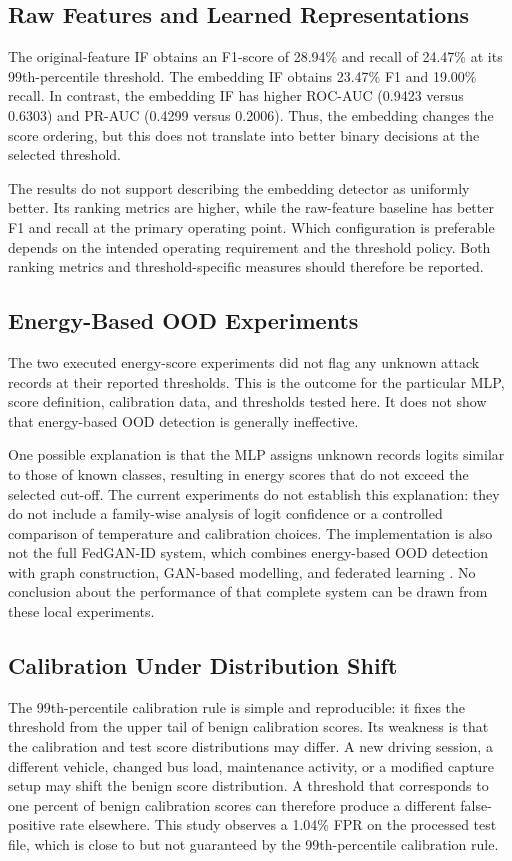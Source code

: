 \documentclass[journal]{IEEEtran}
\begin{document}
\subsection{Raw Features and Learned Representations}
The original-feature IF obtains an F1-score of 28.94\% and recall of 24.47\% at its 99th-percentile threshold. The embedding IF obtains 23.47\% F1 and 19.00\% recall. In contrast, the embedding IF has higher ROC-AUC (0.9423 versus 0.6303) and PR-AUC (0.4299 versus 0.2006). Thus, the embedding changes the score ordering, but this does not translate into better binary decisions at the selected threshold.

The results do not support describing the embedding detector as uniformly better. Its ranking metrics are higher, while the raw-feature baseline has better F1 and recall at the primary operating point. Which configuration is preferable depends on the intended operating requirement and the threshold policy. Both ranking metrics and threshold-specific measures should therefore be reported.

\subsection{Energy-Based OOD Experiments}
The two executed energy-score experiments did not flag any unknown attack records at their reported thresholds. This is the outcome for the particular MLP, score definition, calibration data, and thresholds tested here. It does not show that energy-based OOD detection is generally ineffective.

One possible explanation is that the MLP assigns unknown records logits similar to those of known classes, resulting in energy scores that do not exceed the selected cut-off. The current experiments do not establish this explanation: they do not include a family-wise analysis of logit confidence or a controlled comparison of temperature and calibration choices. The implementation is also not the full FedGAN-ID system, which combines energy-based OOD detection with graph construction, GAN-based modelling, and federated learning \cite{chen2025fedgan}. No conclusion about the performance of that complete system can be drawn from these local experiments.

\subsection{Calibration Under Distribution Shift}
The 99th-percentile calibration rule is simple and reproducible: it fixes the threshold from the upper tail of benign calibration scores. Its weakness is that the calibration and test score distributions may differ. A new driving session, a different vehicle, changed bus load, maintenance activity, or a modified capture setup may shift the benign score distribution. A threshold that corresponds to one percent of benign calibration scores can therefore produce a different false-positive rate elsewhere. This study observes a 1.04\% FPR on the processed test file, which is close to but not guaranteed by the 99th-percentile calibration rule.
\end{document}
